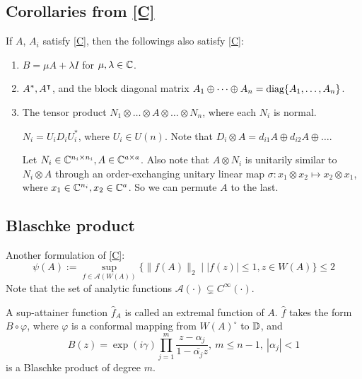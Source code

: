 \documentclass[12pt]{article} %
\begin{document}
\subsection{Corollaries from \ref{C}}
If $A$, $A_i$ satisfy \ref{C}, then the followings also satisfy \ref{C}: \cite{oloughlin_2023}
\begin{enumerate}
    \item $B = \mu A + \lambda I$ for $\mu,\lambda \in \mathbb{C}$.
    \item $A^*, A^\intercal$, and the block diagonal matrix $A_1 \oplus \dots \oplus A_n = \text{diag}\{A_1,\dots, A_n\}$.
    \item The tensor product $N_1 \otimes \dots \otimes A \otimes \dots \otimes N_n $, where each $N_i$ is normal. 
    
    \Prf $N_i = U_i D_i U_i^*$, where $U_i\in U(n)$. Note that $D_i \otimes A = d_{i1}A \oplus d_{i2}A \oplus \dots$. 
    
    Let $N_i \in \mathbb{C}^{n_i \times n_i}, A\in \mathbb{C}^{a\times a}$. Also note that $A \otimes N_i$ is unitarily similar to $N_i \otimes A$ through an order-exchanging unitary linear map $\sigma: x_1 \otimes x_2 \mapsto x_2 \otimes x_1 $, where $x_1 \in \mathbb{C}^{n_i}, x_2 \in \mathbb{C}^a$. So we can permute $A$ to the last. \QED
\end{enumerate}

\subsection{Blaschke product}
Another formulation of \ref{C}:
\begin{equation}
    \psi(A) :=  \sup_{f \in \mathcal{A} (W(A))} \big\{ \|f(A)\|_2 \mid |f(z)| \le 1, z\in W(A) \big\} \le 2
\end{equation}
Note that the set of analytic functions $\mathcal{A}(\cdot) \subsetneq C^\infty(\cdot)$.

A sup-attainer function $\hat f_A$ is called an extremal function of $A$. $\hat f$ takes the form $B \circ \varphi$, where $\varphi$ is a conformal mapping from $W(A)^\circ$ to $\mathbb{D}$, and 
\[ B(z) = \exp(i\gamma) \prod_{j=1}^m \frac{z-\alpha_j}{1 - \bar{\alpha_j} z}, \ m \le n-1, \ |\alpha_j|<1 \]
is a Blaschke product of degree $m$.
\end{document}
